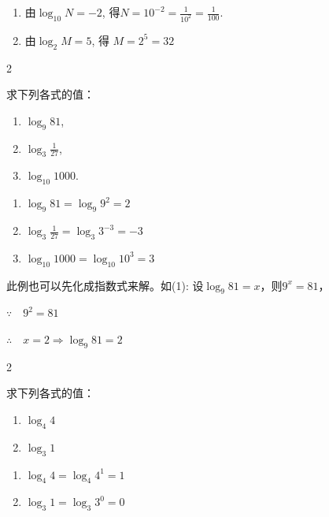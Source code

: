 \begin{solution}
\begin{enumerate}[(1)]
    \item 由$\log_{10}N=-2$, 得$N=10^{-2}=\frac{1}{10^{2}}=\frac{1}{100}$.
    \item 由$\log _2M= 5$, 得 $M= 2^5= 32$
\end{enumerate}
\end{solution}
 
\begin{multicols}{2}
    \begin{example}
    求下列各式的值：
\begin{enumerate}[(1)]
    \item $\log_9 81$,
    \item $\log_3\frac 1{27}$,
    \item $\log_{10} 1000$.
\end{enumerate}    

\end{example}
 
\begin{solution}
\begin{enumerate}[(1)]
    \item $\log_{9}81=\log_9 9^2=2$
    \item $\log_3\frac 1{27}=\log_{3}3^{- 3}= - 3$
\item $\log_{10}1000=\log_{10}10^3=3$
\end{enumerate}
\end{solution} 
\end{multicols}


\begin{rmk}
    此例也可以先化成指数式来解。如(1): 
    设$\log_9 81=x$，则$9^x=81$，

$\because\quad 9^2=81$

$\therefore\quad x=2\Longrightarrow \log_9 81=2$
\end{rmk}

\begin{multicols}{2}
\begin{example}
    求下列各式的值：
\begin{enumerate}[(1)]
    \item $\log_4 4$
    \item $\log_3 1$
\end{enumerate}
\end{example}
 
\begin{solution}
    \begin{enumerate}[(1)]
        \item $\log_4 4=\log_4 4^1=1$
        \item $\log_3 1=\log_3 3^0=0$
    \end{enumerate}
\end{solution}    
\end{multicols}



